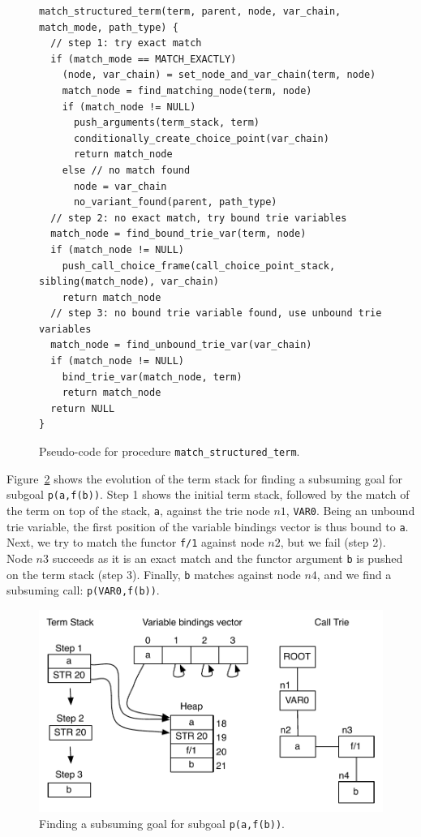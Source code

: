 \begin{figure}[ht]
\begin{Verbatim}
match_structured_term(term, parent, node, var_chain, match_mode, path_type) {
  // step 1: try exact match
  if (match_mode == MATCH_EXACTLY)
    (node, var_chain) = set_node_and_var_chain(term, node)
    match_node = find_matching_node(term, node)
    if (match_node != NULL)
      push_arguments(term_stack, term)
      conditionally_create_choice_point(var_chain)
      return match_node
    else // no match found
      node = var_chain
      no_variant_found(parent, path_type)
  // step 2: no exact match, try bound trie variables
  match_node = find_bound_trie_var(term, node)
  if (match_node != NULL)
    push_call_choice_frame(call_choice_point_stack, sibling(match_node), var_chain)
    return match_node
  // step 3: no bound trie variable found, use unbound trie variables
  match_node = find_unbound_trie_var(var_chain)
  if (match_node != NULL)
    bind_trie_var(match_node, term)
    return match_node
  return NULL
}
\end{Verbatim}
\caption{Pseudo-code for procedure \texttt{match\_structured\_term}.}
\label{fig:match_structured_term}
\end{figure}

Figure~\ref{fig:match_functor} shows the evolution of the term stack for finding
a subsuming goal for subgoal \texttt{p(a,f(b))}. Step 1 shows the initial
term stack, followed by the match of the term on top of the stack, \texttt{a},
against the trie node $n1$, \texttt{VAR0}.
Being an unbound trie variable, the first position of the variable bindings
vector is thus bound to \texttt{a}.
Next, we try to match the functor \texttt{f/1} against node $n2$, but we fail (step 2).
Node $n3$ succeeds as it is an exact match and the functor argument \texttt{b} is pushed on
the term stack (step 3). Finally, \texttt{b} matches against node $n4$, and we find
a subsuming call: \texttt{p(VAR0,f(b))}.

\begin{figure}[ht]
  \centering
    \includegraphics[scale=0.6]{match_functor.pdf}
  \caption{Finding a subsuming goal for subgoal \texttt{p(a,f(b))}.}
  \label{fig:match_functor}
\end{figure}

